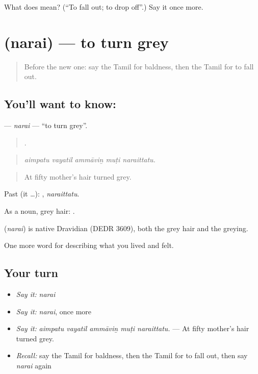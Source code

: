 \begin{tcolorbox}[breakable,colback=teal!4,colframe=teal!35!black,title={Before you move on}]
What does  mean? (\textquotedblleft{}To fall out; to drop off\textquotedblright{}.) Say it once more.
\end{tcolorbox}
\section[\texorpdfstring{\ta{நரை} (narai)}{நரை (narai)}]{ (narai) — to turn grey}

\label{lesson:TA-C484-narai}



\begin{quote}
Before the new one: say the Tamil for baldness, then the Tamil for to fall out.
\end{quote}

\subsection*{You'll want to know: }
\textbf{} — \emph{narai} — \textquotedblleft{}to turn grey\textquotedblright{}.

\begin{quote}
    .
\end{quote}

\begin{quote}
\emph{aimpatu vayatil ammāviṉ muṭi naraittatu.}
\end{quote}

\begin{quote}
At fifty mother’s hair turned grey.
\end{quote}

Past (it …): , \emph{naraittatu}.

As a noun, grey hair:  .

\begin{cousinweb}
\textbf{} (\emph{narai}) is native Dravidian (DEDR 3609), both the grey hair and the greying.
\end{cousinweb}

\begin{grammarlens}[title={What you've built}]
One more word for describing what you lived and felt.
\end{grammarlens}

\subsection*{Your turn}
\begin{itemize}
\raggedright
  \item \emph{Say it:} \emph{narai}
  \item \emph{Say it:} \emph{narai}, once more
  \item \emph{Say it:} \emph{aimpatu vayatil ammāviṉ muṭi naraittatu.} — At fifty mother’s hair turned grey.
  \item \emph{Recall:} say the Tamil for baldness, then the Tamil for to fall out, then say \emph{narai} again
\end{itemize}

